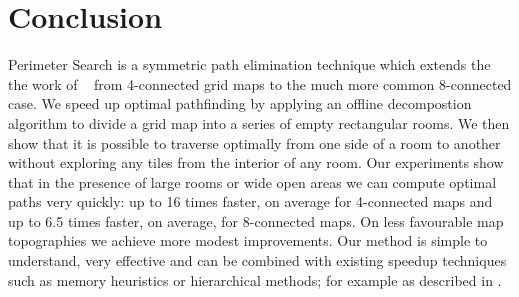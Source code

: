 \section{Conclusion}
Perimeter Search is a symmetric path elimination technique which extends the the
work of \citeauthor{harabor10}~ from 4-connected grid maps
to the much more common 8-connected case.
We speed up optimal pathfinding by applying an offline decompostion algorithm to
divide a grid map into a series of empty rectangular rooms.
We then show that it is possible to traverse optimally from one side of a room
to another without exploring any tiles from the interior of any room.
Our experiments show that in the presence of large rooms or wide open areas we can 
compute optimal paths very quickly: up to 16 times faster, on average for 4-connected maps and up to
6.5 times faster, on average, for 8-connected maps.
On less favourable map topographies we achieve more modest improvements.
Our method is simple to understand, very effective and can be combined with
existing speedup techniques such as memory heuristics or hierarchical methods;
for example as described in \cite{botea04,bjornsson05,bjornsson06}. 
\par
